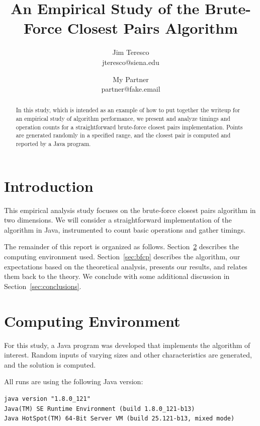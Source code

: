 \documentclass[12pt]{article}
\begin{document}
\title{An Empirical Study of the Brute-Force Closest Pairs Algorithm}

\author{Jim Teresco\\
jteresco@siena.edu\\
\and
My Partner\\
partner@fake.email}

\maketitle

\begin{abstract}
  In this study, which is intended as an example of how to put
  together the writeup for an empirical study of algorithm
  performance, we present and analyze timings and operation counts for
  a straightforward brute-force closest pairs implementation.  Points
  are generated randomly in a specified range, and the closest pair is
  computed and reported by a Java program.
\end{abstract}

\section{Introduction}

This empirical analysis study focuses on the brute-force closest pairs
algorithm in two dimensions.  We will consider a straightforward
implementation of the algorithm in Java, instrumented to count basic
operations and gather timings.

The remainder of this report is organized as follows.
Section~\ref{sec:environment} describes the computing environment
used.  Section~\ref{sec:bfcp} describes the algorithm, our
expectations based on the theoretical analysis, presents our results,
and relates them back to the theory.  We conclude with some additional
discussion in Section~\ref{sec:conclusions}.

\section{Computing Environment}
\label{sec:environment}

For this study, a Java program was developed that implements the
algorithm of interest.  Random inputs of varying sizes and other
characteristics are generated, and the solution is computed.

All runs are using the following Java version:

\begin{verbatim}
java version "1.8.0_121"
Java(TM) SE Runtime Environment (build 1.8.0_121-b13)
Java HotSpot(TM) 64-Bit Server VM (build 25.121-b13, mixed mode)
\end{verbatim}
\end{document}
